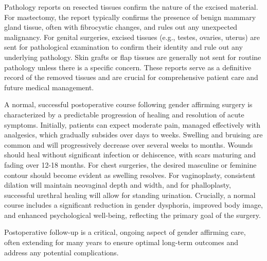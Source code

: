 Pathology reports on resected tissues confirm the nature of the excised material. For mastectomy, the report typically confirms the presence of benign mammary gland tissue, often with fibrocystic changes, and rules out any unexpected malignancy. For genital surgeries, excised tissues (e.g., testes, ovaries, uterus) are sent for pathological examination to confirm their identity and rule out any underlying pathology. Skin grafts or flap tissues are generally not sent for routine pathology unless there is a specific concern. These reports serve as a definitive record of the removed tissues and are crucial for comprehensive patient care and future medical management.

A normal, successful postoperative course following gender affirming surgery is characterized by a predictable progression of healing and resolution of acute symptoms. Initially, patients can expect moderate pain, managed effectively with analgesics, which gradually subsides over days to weeks. Swelling and bruising are common and will progressively decrease over several weeks to months. Wounds should heal without significant infection or dehiscence, with scars maturing and fading over 12-18 months. For chest surgeries, the desired masculine or feminine contour should become evident as swelling resolves. For vaginoplasty, consistent dilation will maintain neovaginal depth and width, and for phalloplasty, successful urethral healing will allow for standing urination. Crucially, a normal course includes a significant reduction in gender dysphoria, improved body image, and enhanced psychological well-being, reflecting the primary goal of the surgery.

Postoperative follow-up is a critical, ongoing aspect of gender affirming care, often extending for many years to ensure optimal long-term outcomes and address any potential complications.


